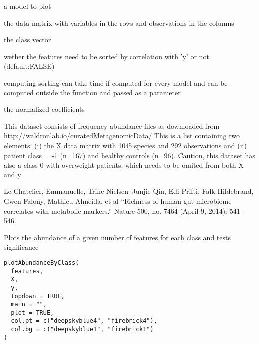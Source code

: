 \documentclass[a4paper]{book}
\begin{document}
%
\begin{Arguments}
\begin{ldescription}
\item[\code{mod:}] a model to plot

\item[\code{X:}] the data matrix with variables in the rows and observations in the columns

\item[\code{y:}] the class vector

\item[\code{sort.features:}] wether the features need to be sorted by correlation with 'y' or not (default:FALSE)

\item[\code{sort.ind:}] computing sorting can take time if computed for every model and can be computed outside the function and passed as a parameter
\end{ldescription}
\end{Arguments}
%
\begin{Value}
the normalized coefficients
\end{Value}
%
\begin{Description}
This dataset consists of frequency abundance files as downloaded from http://waldronlab.io/curatedMetagenomicData/
This is a list containing two elements: (i) the X data matrix with 1045 species and 292 observations and (ii) patient class = -1 (n=167) and healthy controls (n=96).
Caution, this dataset has also a class 0 with overweight patients, which needs to be omited from both X and y
\end{Description}
%
\begin{Author}
Le Chatelier, Emmanuelle, Trine Nielsen, Junjie Qin, Edi Prifti, Falk Hildebrand, Gwen Falony, Mathieu Almeida, et al “Richness of human gut microbiome correlates with metabolic markers.” Nature 500, no. 7464 (April 9, 2014): 541–546.
\end{Author}
%
\begin{Description}
Plots the abundance of a given number of features for each class and tests significance
\end{Description}
%
\begin{Usage}
\begin{verbatim}
plotAbundanceByClass(
  features,
  X,
  y,
  topdown = TRUE,
  main = "",
  plot = TRUE,
  col.pt = c("deepskyblue4", "firebrick4"),
  col.bg = c("deepskyblue1", "firebrick1")
)
\end{verbatim}
\end{Usage}
\end{document}
